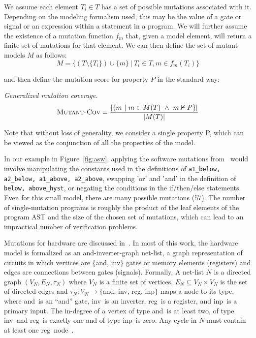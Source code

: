 We assume each element $T_i \in T$ has a set of possible mutations associated with it.  Depending on the modeling formalism used, this may be the value of a gate or signal or an expression within a statement in a program.  We will further assume the existence of a mutation function $f_{m}$ that, given a model element, will return a finite set of mutations for that element.  We can then define the set of mutant models $M$ as follows:
\[
    M = \{ (T \setminus \{T_i\}) \cup \{m\} \ |\ T_i \in T, m \in f_{m}(T_i) \}
\]

\noindent and then define the mutation score for property $P$ in the standard way:

\begin{definition} {\emph{Generalized mutation coverage.} } \\
\[
   \text{\sc Mutant-Cov} = \frac{ | \{m~|~ m \in M(T)~\land~m \nvdash P\} |}{|M(T)|}
\]
\end{definition}
Note that without loss of generality, we consider a single property P, which can be viewed as the conjunction of all the properties of the model.

In our example in Figure~\ref{fig:asw}, applying the software mutations from~\cite{Andrews06:mutation} would involve manipulating the constants used in the definitions of \texttt{a1\_below, a2\_below, a1\_above, a2\_above}, swapping 'or' and 'and' in the definition of \texttt{below, above\_hyst}, or negating the conditions in the if/then/else statements.  Even for this small model, there are many possible mutations (57).  The number of single-mutation programs is roughly the product of the leaf elements of the program AST and the size of the chosen set of mutations, which can lead to an impractical number of verification problems.

\newcommand{\andnode}{{\sc and}}
\newcommand{\invnode}{{\sc inv}}
\newcommand{\inpnode}{{\sc inp}}
\newcommand{\regnode}{{\sc reg}}
\newcommand{\mutnode}{{\sc mut}}
\newcommand{\inputnode}{{\sc input}}

Mutations for hardware are discussed in~\cite{chockler2010coverage,Kupferman:2006:SCF,kupferman_theory_2008}.  In most of this work, the hardware model is formalized as an and-inverter-graph net-list, a graph representation of circuits in which vertices are \{\andnode, \invnode\} gates or memory elements (registers) and edges are connections between gates (signals).  Formally, A net-list $N$ is a directed graph $(V_N,E_N, \tau_N)$ where $V_N$ is a finite set of vertices, $E_N \subseteq V_N \times V_N$ is the set of directed edges and $\tau_N : V_N \rightarrow \{$\andnode, \invnode, \regnode, \inpnode$\}$ maps a node to its type, where \andnode\ is an ``and'' gate, \invnode\ is an inverter, \regnode\ is a register, and \inpnode\ is a primary input.  The in-degree of a vertex of type \andnode\ is at least two, of type \invnode\ and \regnode\ is exactly one and of type \inpnode\ is zero. Any cycle in $N$ must contain at least one \regnode\ node~\cite{chockler2010coverage}.

